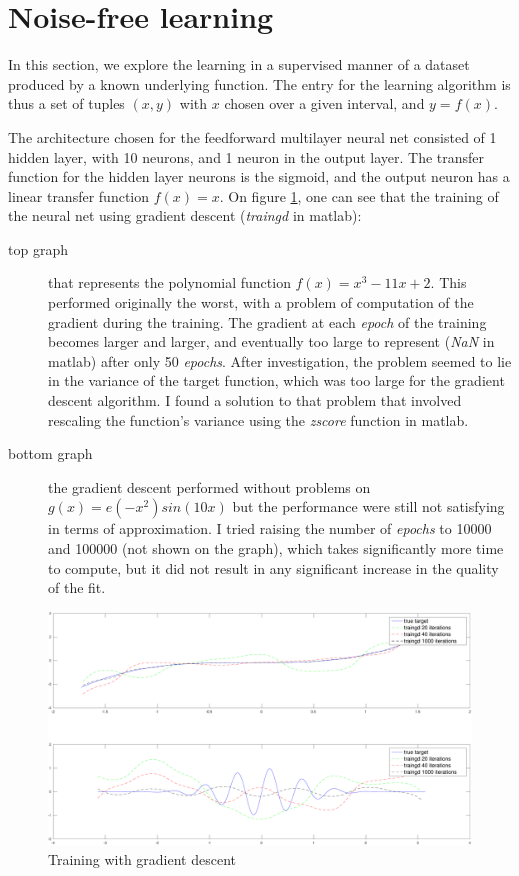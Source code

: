 \documentclass[11pt, a4paper]{article}
\begin{document}
\section{Noise-free learning}
In this section, we explore the learning in a supervised manner of a
dataset produced by a known underlying function. The entry for the
learning algorithm is thus a set of tuples $(x, y)$ with $x$ chosen
over a given interval, and $y=f(x)$.

The architecture chosen for the feedforward multilayer neural net
consisted of 1 hidden layer, with 10 neurons, and 1 neuron in the
output layer. The transfer function for the hidden layer neurons is
the sigmoid, and the output neuron has a linear transfer function
$f(x)=x$. On figure \ref{fig:traingd}, one can see that the training
of the neural net using gradient descent (\emph{traingd} in matlab):

\begin{description}
\item [top graph] that represents the polynomial function
  $f(x)=x^3-11x+2$. This performed originally the worst, with a
  problem of computation of the gradient during the training. The
  gradient at each \emph{epoch} of the training becomes larger and
  larger, and eventually too large to represent (\emph{NaN} in matlab)
  after only 50 \emph{epochs}. After investigation, the problem seemed
  to lie in the variance of the target function, which was too large
  for the gradient descent algorithm. I found a solution to that
  problem that involved rescaling the function's variance using the
  \emph{zscore} function in matlab.
\item [bottom graph] the gradient descent performed without problems
  on $g(x)=e(-x^2)sin(10x)$ but the performance were still not
  satisfying in terms of approximation. I tried raising the number of
  \emph{epochs} to 10000 and 100000 (not shown on the graph), which
  takes significantly more time to compute, but it did not result in
  any significant increase in the quality of the fit.
\end{description}

\begin{figure}[H]
  \includegraphics[scale=.43]{traingd.pdf}
  \caption{Training with gradient descent}
  \label{fig:traingd}
\end{figure}
\end{document}
